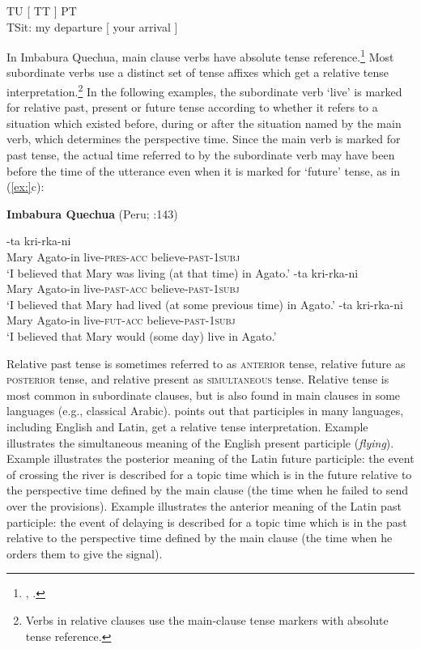 \ea
TU  [  TT  ]  PT  \\
      \textbf{{\textbar}}TSit: my departure\textbf{{\textbar}}    [ your arrival ]
\z


In Imbabura Quechua, main clause verbs have absolute tense reference.\footnote{\citet{Cole1982}, \citet[61]{Comrie1985}.} Most subordinate verbs use a distinct set of tense affixes which get a relative tense interpretation.\footnote{Verbs in relative clauses use the main-clause tense markers with absolute tense reference.} In the following examples, the subordinate verb ‘live’ is marked for relative past, present or future tense according to whether it refers to a situation which existed before, during or after the situation named by the main verb, which determines the perspective time. Since the main verb is marked for past tense, the actual time referred to by the subordinate verb may have been before the time of the utterance even when it is marked for ‘future’ tense, as in (\ref{ex:}c):


\ea
\textbf{Imbabura Quechua} (Peru; \citealt{Cole1982}:143)
\z

\ea
{}-ta  kri-rka-ni\\
Mary  Agato-in  live-\textsc{pres}-\textsc{acc}  believe-\textsc{past}-\textsc{1subj}\\
‘I believed that Mary was living (at that time) in Agato.’
-ta  kri-rka-ni\\
Mary  Agato-in  live-\textsc{past}-\textsc{acc}  believe-\textsc{past}-\textsc{1subj}\\
‘I believed that Mary had lived (at some previous time) in Agato.’
-ta  kri-rka-ni\\
Mary  Agato-in  live-\textsc{fut}-\textsc{acc}  believe-\textsc{past}-\textsc{1subj}\\
‘I believed that Mary would (some day) live in Agato.’
\z \z


Relative past tense is sometimes referred to as \textsc{anterior} tense, relative future as \textsc{posterior} tense, and relative present as \textsc{simultaneous} tense. Relative tense is most common in subordinate clauses, but is also found in main clauses in some languages (e.g., classical Arabic). \citet{Comrie1985} points out that participles in many languages, including English and Latin, get a relative tense interpretation. Example  illustrates the simultaneous meaning of the English present participle (\textit{flying}). Example  illustrates the posterior meaning of the Latin future participle: the event of crossing the river is described for a topic time which is in the future relative to the perspective time defined by the main clause (the time when he failed to send over the provisions). Example  illustrates the anterior meaning of the Latin past participle: the event of delaying is described for a topic time which is in the past relative to the perspective time defined by the main clause (the time when he orders them to give the signal).


